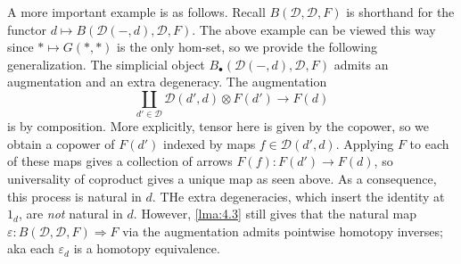 A more important example is as follows. Recall $B(\mathcal{D} ,\mathcal{D} ,F)$ is shorthand for the functor $d\mapsto B(\mathcal{D} (-,d),\mathcal{D} ,F)$. The above example can be viewed this way since $*\mapsto G(*,*)$ is the only hom-set, so we provide the following generalization. The simplicial object $B_{\bullet} (\mathcal{D} (-,d),\mathcal{D} ,F)$ admits an augmentation and an extra degeneracy. The augmentation
\[
	\coprod_{d'\in \mathcal{D} } \mathcal{D} (d',d)\otimes F(d')\to F(d)
\]
is by composition. More explicitly, tensor here is given by the copower, so we obtain a copower of $F(d')$ indexed by maps $f\in \mathcal{D} (d',d)$. Applying $F$ to each of these maps gives a collection of arrows $F(f): F(d') \to F(d)$, so universality of coproduct gives a unique map as seen above. As a consequence, this process is natural in $d$. THe extra degeneracies, which insert the identity at $1_d$, are \emph{not} natural in $d$. However, \cref{lma:4.3} still gives that the natural map $\varepsilon : B(\mathcal{D} ,\mathcal{D} ,F) \Rightarrow F$ via the augmentation admits pointwise homotopy inverses; aka each $\varepsilon _d$ is a homotopy equivalence.
